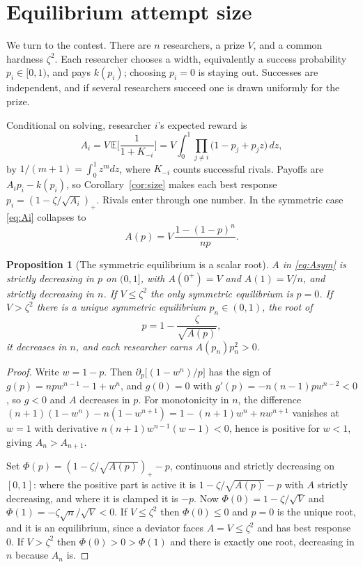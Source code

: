 \documentclass[11pt]{article}
\theoremstyle{itheads}
\newtheorem{proposition}{Proposition}
\newcommand{\E}{\mathbb{E}}
\begin{document}
\section{Equilibrium attempt size}
\label{sec:eq}

We turn to the contest. There are $n$ researchers, a prize $V$, and a common
hardness $\zeta^{2}$. Each researcher chooses a width, equivalently a
success probability $p_{i}\in[0,1)$, and pays $k(p_{i})$; choosing
$p_{i}=0$ is staying out. Successes are independent, and if several
researchers succeed one is drawn uniformly for the prize.

Conditional on solving, researcher $i$'s expected reward is
\begin{equation}
A_{i}=V\,\E\Big[\frac{1}{1+K_{-i}}\Big]
=V\int_{0}^{1}\prod_{j\ne i}\big(1-p_{j}+p_{j}z\big)\,dz,
\label{eq:Ai}
\end{equation}
by $1/(m+1)=\int_{0}^{1}z^{m}dz$, where $K_{-i}$ counts successful rivals.
Payoffs are $A_{i}p_{i}-k(p_{i})$, so Corollary~\ref{cor:size} makes each
best response $p_{i}=(1-\zeta/\sqrt{A_{i}})_{+}$. Rivals enter through one
number. In the symmetric case \eqref{eq:Ai} collapses to
\begin{equation}
A(p)=V\,\frac{1-(1-p)^{n}}{np}.
\label{eq:Asym}
\end{equation}

\begin{proposition}[The symmetric equilibrium is a scalar root]
\label{prop:eqfinite}
$A$ in \eqref{eq:Asym} is strictly decreasing in $p$ on $(0,1]$, with
$A(0^{+})=V$ and $A(1)=V/n$, and strictly decreasing in $n$. If
$V\le\zeta^{2}$ the only symmetric equilibrium is $p=0$. If
$V>\zeta^{2}$ there is a unique symmetric equilibrium $p_{n}\in(0,1)$, the
root of
\begin{equation}
p=1-\frac{\zeta}{\sqrt{A(p)}},
\end{equation}
it decreases in $n$, and each researcher earns $A(p_{n})p_{n}^{2}>0$.
\end{proposition}

\begin{proof}
Write $w=1-p$. Then $\partial_{p}\big[(1-w^{n})/p\big]$ has the sign of
$g(p)=npw^{n-1}-1+w^{n}$, and $g(0)=0$ with
$g'(p)=-n(n-1)pw^{n-2}<0$, so $g<0$ and $A$ decreases in $p$. For
monotonicity in $n$, the difference
$(n+1)(1-w^{n})-n(1-w^{n+1})=1-(n+1)w^{n}+nw^{n+1}$ vanishes at $w=1$ with
derivative $n(n+1)w^{n-1}(w-1)<0$, hence is positive for $w<1$, giving
$A_{n}>A_{n+1}$.

Set $\Phi(p)=(1-\zeta/\sqrt{A(p)})_{+}-p$, continuous and strictly
decreasing on $[0,1]$: where the positive part is active it is
$1-\zeta/\sqrt{A(p)}-p$ with $A$ strictly decreasing, and where it is
clamped it is $-p$. Now $\Phi(0)=1-\zeta/\sqrt V$ and
$\Phi(1)=-\zeta\sqrt n/\sqrt V<0$. If $V\le\zeta^{2}$ then $\Phi(0)\le0$
and $p=0$ is the unique root, and it is an equilibrium, since a deviator
faces $A=V\le\zeta^{2}$ and has best response $0$. If $V>\zeta^{2}$ then
$\Phi(0)>0>\Phi(1)$ and there is exactly one root, decreasing in $n$
because $A_{n}$ is.
\end{proof}
\end{document}
